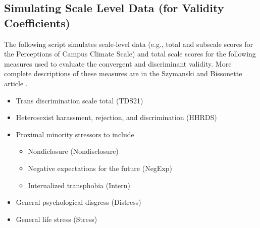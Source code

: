 \documentclass[
  english,
]{book}
\providecommand{\tightlist}{%
  \setlength{\itemsep}{0pt}\setlength{\parskip}{0pt}}
\begin{document}
\hypertarget{simulating-scale-level-data-for-validity-coefficients-1}{%
\subsection{Simulating Scale Level Data (for Validity Coefficients)}\label{simulating-scale-level-data-for-validity-coefficients-1}}

The following script simulates scale-level data (e.g., total and subscale scores for the Perceptions of Campus Climate Scale) and total scale scores for the following measures used to evaluate the convergent and discriminant validity. More complete descriptions of these measures are in the Szymanski and Bissonette article \citeyearpar{szymanski_perceptions_2020}.

\begin{itemize}
\tightlist
\item
  Trans discrimination scale total (TDS21)
\item
  Heterosexist harassment, rejection, and discrimination (HHRDS)
\item
  Proximal minority stressors to include

  \begin{itemize}
  \tightlist
  \item
    Nondiclosure (Nondisclosure)
  \item
    Negative expectations for the future (NegExp)
  \item
    Internalized transphobia (Intern)
  \end{itemize}
\item
  General psychological disgress (Distress)
\item
  General life stress (Stress)
\end{itemize}
\end{document}

